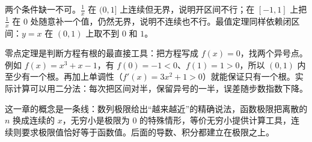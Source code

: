 两个条件缺一不可。$\frac1x$ 在 $(0,1]$ 上连续但无界，说明开区间不行；在 $[-1,1]$ 上把 $\frac1x$ 在 $0$ 处随意补一个值，仍然无界，说明不连续也不行。最值定理同样依赖闭区间：$y=x$ 在 $(0,1)$ 上取不到 $0$ 和 $1$。

零点定理是判断方程有根的最直接工具：把方程写成 $f(x)=0$，找两个异号点。例如 $f(x)=x^3+x-1$，有 $f(0)=-1<0$、$f(1)=1>0$，所以 $(0,1)$ 内至少有一个根。再加上单调性（$f'(x)=3x^2+1>0$）就能保证只有一个根。实际计算可以用二分法：每次把区间对半，保留异号的一半，误差随步数指数下降。

这一章的概念是一条线：数列极限给出“越来越近”的精确说法，函数极限把离散的 $n$ 换成连续的 $x$，无穷小是极限为 $0$ 的特殊情形，等价无穷小提供计算工具，连续则要求极限值恰好等于函数值。后面的导数、积分都建立在极限之上。


